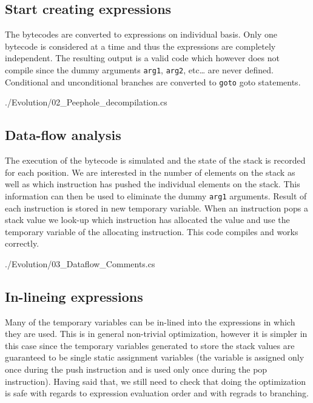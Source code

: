 \documentclass[12pt]{article}
\begin{document}
\newpage
\subsection*{Start creating expressions}

The bytecodes are converted to \CS expressions on individual basis.
Only one bytecode is considered at a time and thus the expressions
are completely independent.  The resulting output is a valid \CS code
which however does not compile since the dummy arguments \verb|arg1|, 
\verb|arg2|, etc\dots{} are never defined.  Conditional and unconditional
branches are converted to \verb|goto| goto statements.


{./Evolution/02_Peephole_decompilation.cs}

\newpage
\subsection*{Data-flow analysis}

The execution of the bytecode is simulated and the state of the stack is 
recorded for each position.  We are interested in the number of 
elements on the stack as well as which instruction has pushed the 
individual elements on the stack.  This information can then be used to eliminate 
the dummy \verb|arg1| arguments.  Result of each instruction is stored
in new temporary variable.  When an instruction pops a stack value
we look-up which instruction has allocated the value and use the temporary
variable of the allocating instruction.
This code compiles and works correctly.


{./Evolution/03_Dataflow_Comments.cs}

\newpage
\subsection*{In-lineing expressions}

Many of the temporary variables can be in-lined into the expressions in which
they are used.  This is in general non-trivial optimization, however it is 
simpler in this case since the temporary variables generated to store the
stack values are guaranteed to be single static assignment variables (the 
variable is assigned only once during the push instruction and is used
only once during the pop instruction).
Having said that, we still need to check that doing the optimization is
safe with regards to expression evaluation order and with regrads to branching.
\end{document}
